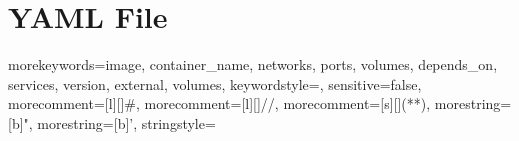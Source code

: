 \appendix
\chapter{YAML File}
\label{app:yamlfile}

    {morekeywords={image, container_name, networks, ports, volumes, depends_on, services, version, external, volumes},
    keywordstyle=\color{bluekeywords},
    sensitive=false,
    morecomment=[l][\color{greencomments}]{\#},
    morecomment=[l][\color{greencomments}]{//},
    morecomment=[s][\color{greencomments}]{{(*}{*)}},
    morestring=[b]",
    morestring=[b]',
    stringstyle=\color{redstrings}
    }

    {
      \lstset{
          language=YAML,
          basicstyle=\ttfamily,
          breaklines=true,
          columns=fullflexible}
    }
    {}

